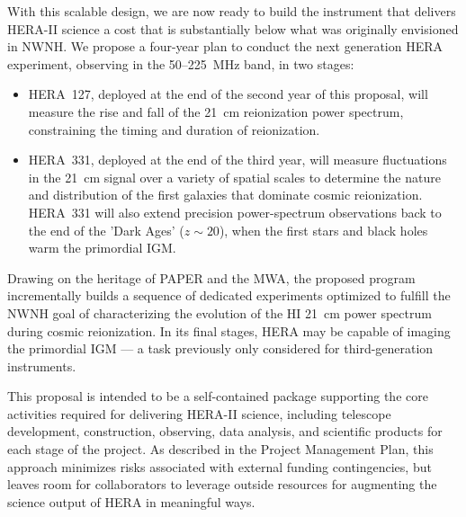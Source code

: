 \documentclass[preprint]{aastex}
\begin{document}
With this scalable design, we are now ready to build the instrument
that delivers HERA-II science
a cost that is substantially below what was originally envisioned in NWNH.
We propose a four-year plan to conduct the next generation HERA experiment,
observing in the 50--225~MHz band, in two stages:
\begin{itemize}[noitemsep,nolistsep]

\item HERA~127, deployed at the end of the second year of this proposal, will measure the rise and fall of the 
21~cm reionization power spectrum, constraining the timing and duration of reionization.

\item HERA~331, deployed at the end of the third year, will measure fluctuations in the 21~cm
signal over a variety of spatial
scales to determine the nature and distribution of the first galaxies
that dominate cosmic reionization. HERA~331 will also extend precision
power-spectrum observations back to the end of the 'Dark Ages' ($z \sim 20$), 
when the first stars and black holes warm the primordial IGM. 
\end{itemize}
Drawing on the heritage of PAPER and the MWA, the proposed program incrementally builds a 
sequence of dedicated experiments
optimized to fulfill the NWNH goal of characterizing the evolution of
the HI 21~cm power spectrum during cosmic reionization. In
its final stages, HERA may be capable of imaging the primordial
IGM --- a task previously only considered for third-generation
instruments. 

This proposal is intended to be a self-contained package
supporting the core activities required for delivering HERA-II science,
including telescope development, construction, observing, data analysis,
and scientific products for each stage of the project.  As described
in the Project Management Plan, this approach minimizes
risks associated with external funding contingencies, but leaves room for
collaborators to leverage outside resources for augmenting the science
output of HERA in meaningful ways.


\end{document}
